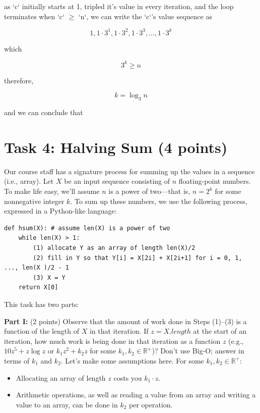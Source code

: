 \documentclass{article}
\theoremstyle{remark}
\begin{document}
as `c` initially starts at 1, tripled it's value in every iteration, and the loop terminates when `c` $\ge$ `n`, we can write the `c`'s value sequence as

\[1, 1\cdot3^1, 1\cdot3^2, 1\cdot3^3, ..., 1\cdot3^k\]

which 

\[3^k \ge n\]

therefore, 

\[k = \log_3 n\]

and we can conclude that 

\vspace{1em}
\hrulefill

\section*{Task 4: Halving Sum (4 points)}

Our course staff has a signature process for summing up the values in a sequence (i.e., array). Let $X$ be an input sequence consisting of $n$ floating-point numbers. To make life easy, we’ll assume $n$ is a power of two—that is, $n = 2^k$ for some nonnegative integer $k$. To sum up these numbers, we use the following process, expressed in a Python-like language:

\begin{verbatim}
def hsum(X): # assume len(X) is a power of two
    while len(X) > 1:
        (1) allocate Y as an array of length len(X)/2
        (2) fill in Y so that Y[i] = X[2i] + X[2i+1] for i = 0, 1, ..., len(X )/2 - 1
        (3) X = Y
    return X[0]
\end{verbatim}

This task has two parts:

\textbf{Part I:} (2 points) Observe that the amount of work done in Steps (1)–(3) is a function of the length of $X$ in that iteration. If $z = X.length$ at the start of an iteration, how much work is being done in that iteration as a function $z$ (e.g., $10z^5 + z \log z$ or $k_1 z^2 + k_2 z$ for some $k_1, k_2 \in \mathbb{R}^+$)? Don’t use Big-O; answer in terms of $k_1$ and $k_2$. Let’s make some assumptions here. For some $k_1, k_2 \in \mathbb{R}^+$:

\begin{itemize}
    \item Allocating an array of length $z$ costs you $k_1 \cdot z$.
    \item Arithmetic operations, as well as reading a value from an array and writing a value to an array, can be done in $k_2$ per operation.
\end{itemize}
\end{document}
